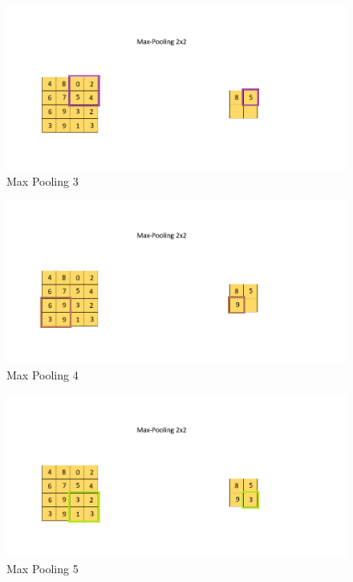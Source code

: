 \documentclass[a4paper,12pt]{report}
\begin{document}
\begin{figure}[htbp]
  \centering
  \includegraphics[width=\textwidth]{images/CNN_Max_Pooling_2.png}
  \caption{Max Pooling 3}
  \label{fig:fullwidth}
\end{figure}
\FloatBarrier
\begin{figure}[htbp]
  \centering
  \includegraphics[width=\textwidth]{images/CNN_Max_Pooling_3.png}
  \caption{Max Pooling 4}
  \label{fig:fullwidth}
\end{figure}
	
\begin{figure}[htbp]
  \centering
  \includegraphics[width=\textwidth]{images/CNN_Max_Pooling_4.png}
  \caption{Max Pooling 5}
  \label{fig:fullwidth}
\end{figure}
	
\end{document}
